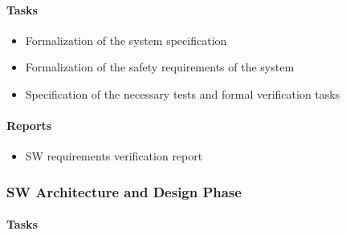 \paragraph{Tasks}
\label{sec:tasks}
\begin{itemize}
\item Formalization of the system specification
\item Formalization of the safety requirements of the system
\item Specification of the necessary tests and formal verification tasks
\end{itemize}

\paragraph{Reports}
\label{sec:sw-req-report}
\begin{itemize}
\item SW requirements verification report
\end{itemize}

\subsubsection{SW Architecture and Design Phase}
\label{sec:sw-arch-design}

\paragraph{Tasks}
\label{sec:tasks-1}



